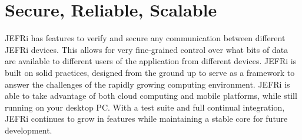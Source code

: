\documentclass{article}
\begin{document}
\section{Secure, Reliable, Scalable}
JEFRi has features to verify and secure any communication between different
JEFRi devices. This allows for very fine-grained control over what bits of data
are available to different users of the application from different devices.
JEFRi is built on solid practices, designed from the ground up to serve as a
framework to answer the challenges of the rapidly growing computing environment.
JEFRi is able to take advantage of both cloud computing and mobile platforms,
while still running on your desktop PC. With a test suite and full continual
integration, JEFRi continues to grow in features while maintaining a stable core
for future development.
\end{document}
